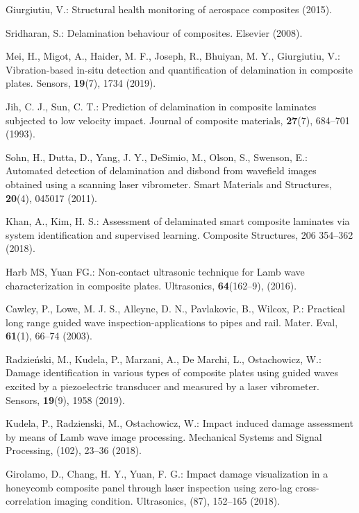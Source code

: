 \documentclass{IOS-Book-Article}
\begin{document}
\begin{thebibliography}{8}
	
	Giurgiutiu, V.: Structural health monitoring of aerospace composites (2015).
	
	Sridharan, S.: Delamination behaviour of composites. Elsevier (2008).
	
	Mei, H., Migot, A., Haider, M. F., Joseph, R., Bhuiyan, M. Y., Giurgiutiu, 
	V.: Vibration-based in-situ detection and quantification of delamination in 
	composite plates. Sensors, \textbf{19}(7), 1734 (2019).
	
	Jih, C. J., Sun, C. T.: Prediction of delamination in composite laminates 
	subjected to low velocity impact. Journal of composite materials, 
	\textbf{27}(7), 684--701 (1993).
	
	Sohn, H., Dutta, D., Yang, J. Y., DeSimio, M., Olson, S., Swenson, E.: 
	Automated detection of delamination and disbond from wavefield images obtained 
	using a scanning laser vibrometer. Smart Materials and Structures, 
	\textbf{20}(4), 
	045017 (2011).
	
	Khan, A., Kim, H. S.: Assessment of delaminated smart composite laminates via 
	system identification and supervised learning. Composite Structures, 206 
	354--362 (2018).
	
	Harb MS, Yuan FG.: Non-contact ultrasonic technique for Lamb wave 
	characterization in composite plates. Ultrasonics, \textbf{64}(162--9), (2016).
	
	Cawley, P., Lowe, M. J. S., Alleyne, D. N., Pavlakovic, B., Wilcox, P.: 
	Practical long range guided wave inspection-applications to pipes and rail. 
	Mater. Eval, \textbf{61}(1), 66--74 (2003).
	
	Radzieński, M., Kudela, P., Marzani, A., De Marchi, L., Ostachowicz, W.: Damage 
	identification in various types of composite plates using guided waves excited 
	by a piezoelectric transducer and measured by a laser vibrometer. Sensors,  
	\textbf{19}(9), 1958 (2019).
	
	Kudela, P., Radzienski, M., Ostachowicz, W.: Impact induced damage assessment 
	by means of Lamb wave image processing. Mechanical Systems and Signal 
	Processing, (102), 23--36 (2018).
	
	Girolamo, D., Chang, H. Y., Yuan, F. G.: Impact damage visualization in a 
	honeycomb composite panel through laser inspection using zero-lag 
	cross-correlation imaging condition. Ultrasonics, (87), 152--165 (2018).
	

\end{thebibliography}
\end{document}
